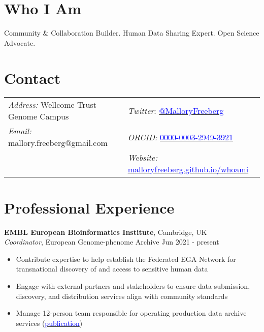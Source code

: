 \documentclass[margin,line]{res}
\begin{document}
\begin{resume}

\section{\sc Who I Am}
Community \& Collaboration Builder. Human Data Sharing Expert. Open Science Advocate.

\section{\sc Contact}
\begin{tabular}{@{}p{3in}p{3in}} %
{\it Address:} Wellcome Trust Genome Campus & {\em Twitter}: \href{https://twitter.com/MalloryFreeberg}{\textcolor{blue}{@MalloryFreeberg}} \\
{\em Email:}  mallory.freeberg@gmail.com & {\em ORCID:} \href{https://orcid.org/0000-0003-2949-3921}{\textcolor{blue}{0000-0003-2949-3921}} \\
{} & {\em Website:} \href{https://malloryfreeberg.github.io/whoami/}{\textcolor{blue}{malloryfreeberg.github.io/whoami}} \\
\end{tabular}


\section{\sc Professional Experience}
{\bf EMBL European Bioinformatics Institute}, Cambridge, UK\\
{\em Coordinator}, European Genome-phenome Archive \hfill {Jun 2021 - present}
\begin{itemize}
\itemsep0em 
	\item Contribute expertise to help establish the Federated EGA Network for transnational discovery of and access to sensitive human data
	\item Engage with external partners and stakeholders to ensure data submission, discovery, and distribution services align with community standards
	\item Manage 12-person team responsible for operating production data archive services (\href{https://doi.org/10.1093/nar/gkab1059}{\textcolor{blue}{publication}})
\end{itemize}


\end{resume}
\end{document}
